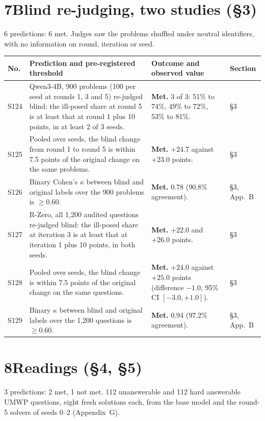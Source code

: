 \documentclass[10pt,a4paper]{article}
\newcommand{\met}{\textbf{Met.}}
\begin{document}
\section*{7\quad Blind re-judging, two studies (\S3)}
6 predictions: 6 met. Judges saw the problems shuffled under neutral identifiers, with no information on round, iteration or seed.

\begingroup\small
\begin{longtable}{@{}L{0.9cm}L{7.8cm}L{6.1cm}L{1.3cm}@{}}
\toprule
No. & Prediction and pre-registered threshold & Outcome and observed value & Section \\
\midrule
\endfirsthead
\bottomrule
\endfoot
S124 & Qwen3-4B, 900 problems (100 per seed at rounds 1, 3 and 5) re-judged blind: the ill-posed share at round 5 is at least that at round 1 plus 10 points, in at least 2 of 3 seeds. & \met{} 3 of 3: 51\% to 74\%, 49\% to 72\%, 53\% to 81\%. & \S3 \\
S125 & Pooled over seeds, the blind change from round 1 to round 5 is within 7.5 points of the original change on the same problems. & \met{} $+24.7$ against $+23.0$ points. & \S3 \\
S126 & Binary Cohen's $\kappa$ between blind and original labels over the 900 problems is $\ge 0.60$. & \met{} 0.78 (90.8\% agreement). & \S3, App.~B \\
S127 & R-Zero, all 1,200 audited questions re-judged blind: the ill-posed share at iteration 3 is at least that at iteration 1 plus 10 points, in both seeds. & \met{} $+22.0$ and $+26.0$ points. & \S3 \\
S128 & Pooled over seeds, the blind change is within 7.5 points of the original change on the same questions. & \met{} $+24.0$ against $+25.0$ points (difference $-1.0$, 95\% CI $[-3.0, +1.0]$). & \S3 \\
S129 & Binary $\kappa$ between blind and original labels over the 1,200 questions is $\ge 0.60$. & \met{} 0.94 (97.2\% agreement). & \S3, App.~B \\
\end{longtable}
\endgroup

\section*{8\quad Readings (\S4, \S5)}
3 predictions: 2 met, 1 not met. 112 unanswerable and 112 hard answerable UMWP questions, eight fresh solutions each, from the base model and the round-5 solvers of seeds 0--2 (Appendix~G).
\end{document}
